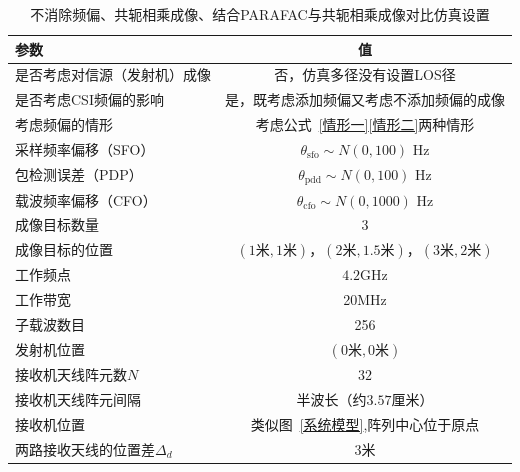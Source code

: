 \begin{table}[htb]
      \begin{center}
          \caption{不消除频偏、共轭相乘成像、结合PARAFAC与共轭相乘成像对比仿真设置}\label{对比}
          \begin{tabular}{lc} %
              \toprule
              参数 & 值 \\
              \midrule
              是否考虑对信源（发射机）成像 & 否，仿真多径没有设置LOS径\\
              是否考虑CSI频偏的影响 & 是，既考虑添加频偏又考虑不添加频偏的成像\\
              考虑频偏的情形  & 考虑公式~\eqref{情形一}\eqref{情形二}两种情形\\
              采样频率偏移（SFO）   &   $\theta_{\text{sfo}}\sim N(0,100)$ Hz\\
              包检测误差（PDP）     &   $\theta_{\text{pdd}}\sim N(0,100)$ Hz\\
              载波频率偏移（CFO）   &   $\theta_{\text{cfo}}\sim N(0,1000)$ Hz\\
              成像目标数量    & 3\\
              成像目标的位置  & $(1\text{米},1\text{米})$，$(2\text{米},1.5\text{米})$，$(3\text{米},2\text{米})$ \\
              工作频点        & $4.2$GHz\\
              工作带宽      & 20MHz \\
              子载波数目      & 256\\
              发射机位置           & $(0\text{米},0\text{米})$\\
              接收机天线阵元数$N$      & $32$\\
              接收机天线阵元间隔    & 半波长（约$3.57$厘米）\\
              接收机位置           & 类似图~\ref{系统模型},阵列中心位于原点\\
              两路接收天线的位置差$\Delta_d$ & $3$米\\
              \bottomrule
          \end{tabular}
      \end{center}
\end{table}

